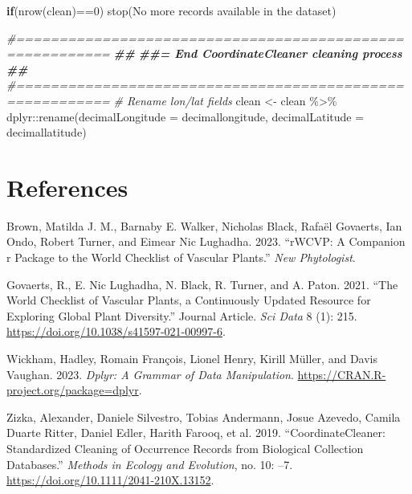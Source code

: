 \documentclass[
]{article}
\newenvironment{Shaded}{\begin{snugshade}}{\end{snugshade}}
\newcommand{\AttributeTok}[1]{\textcolor[rgb]{0.77,0.63,0.00}{#1}}
\newcommand{\CommentTok}[1]{\textcolor[rgb]{0.56,0.35,0.01}{\textit{#1}}}
\newcommand{\ControlFlowTok}[1]{\textcolor[rgb]{0.13,0.29,0.53}{\textbf{#1}}}
\newcommand{\DecValTok}[1]{\textcolor[rgb]{0.00,0.00,0.81}{#1}}
\newcommand{\DocumentationTok}[1]{\textcolor[rgb]{0.56,0.35,0.01}{\textbf{\textit{#1}}}}
\newcommand{\FunctionTok}[1]{\textcolor[rgb]{0.00,0.00,0.00}{#1}}
\newcommand{\NormalTok}[1]{#1}
\newcommand{\OtherTok}[1]{\textcolor[rgb]{0.56,0.35,0.01}{#1}}
\newcommand{\SpecialCharTok}[1]{\textcolor[rgb]{0.00,0.00,0.00}{#1}}
\newcommand{\StringTok}[1]{\textcolor[rgb]{0.31,0.60,0.02}{#1}}
\newlength{\cslhangindent}
\newlength{\cslentryspacingunit} %
\newenvironment{CSLReferences}[2] %
 {%
  \setlength{\parindent}{0pt}
  \ifodd #1
  \let\oldpar\par
  \def\par{\hangindent=\cslhangindent\oldpar}
  \fi
  \setlength{\parskip}{#2\cslentryspacingunit}
 }%
 {}
\begin{document}
\begin{Shaded}
\begin{Highlighting}[]
\ControlFlowTok{if}\NormalTok{(}\FunctionTok{nrow}\NormalTok{(clean)}\SpecialCharTok{==}\DecValTok{0}\NormalTok{) }\FunctionTok{stop}\NormalTok{(}\StringTok{\textquotesingle{}No more records available in the dataset\textquotesingle{}}\NormalTok{)}

\CommentTok{\#=========================================================}
\DocumentationTok{\#\#}
\DocumentationTok{\#\#=  End CoordinateCleaner cleaning process}
\DocumentationTok{\#\#}
\CommentTok{\#=========================================================}
\CommentTok{\# Rename lon/lat fields}
\NormalTok{clean }\OtherTok{\textless{}{-}}\NormalTok{ clean }\SpecialCharTok{\%\textgreater{}\%}
\NormalTok{  dplyr}\SpecialCharTok{::}\FunctionTok{rename}\NormalTok{(}\AttributeTok{decimalLongitude =} \StringTok{\textquotesingle{}decimallongitude\textquotesingle{}}\NormalTok{, }\AttributeTok{decimalLatitude =} \StringTok{\textquotesingle{}decimallatitude\textquotesingle{}}\NormalTok{)}
\end{Highlighting}
\end{Shaded}

\hypertarget{references}{%
\section*{References}\label{references}}

\hypertarget{refs}{}
\begin{CSLReferences}{1}{0}
\leavevmode{}%
Brown, Matilda J. M., Barnaby E. Walker, Nicholas Black, Rafaël
Govaerts, Ian Ondo, Robert Turner, and Eimear Nic Lughadha. 2023.
{``rWCVP: A Companion r Package to the World Checklist of Vascular
Plants.''} \emph{New Phytologist}.

\leavevmode{}%
Govaerts, R., E. Nic Lughadha, N. Black, R. Turner, and A. Paton. 2021.
{``The World Checklist of Vascular Plants, a Continuously Updated
Resource for Exploring Global Plant Diversity.''} Journal Article.
\emph{Sci Data} 8 (1): 215.
\url{https://doi.org/10.1038/s41597-021-00997-6}.

\leavevmode{}%
Wickham, Hadley, Romain François, Lionel Henry, Kirill Müller, and Davis
Vaughan. 2023. \emph{Dplyr: A Grammar of Data Manipulation}.
\url{https://CRAN.R-project.org/package=dplyr}.

\leavevmode{}%
Zizka, Alexander, Daniele Silvestro, Tobias Andermann, Josue Azevedo,
Camila Duarte Ritter, Daniel Edler, Harith Farooq, et al. 2019.
{``CoordinateCleaner: Standardized Cleaning of Occurrence Records from
Biological Collection Databases.''} \emph{Methods in Ecology and
Evolution}, no. 10: --7. \url{https://doi.org/10.1111/2041-210X.13152}.

\end{CSLReferences}
\end{document}
